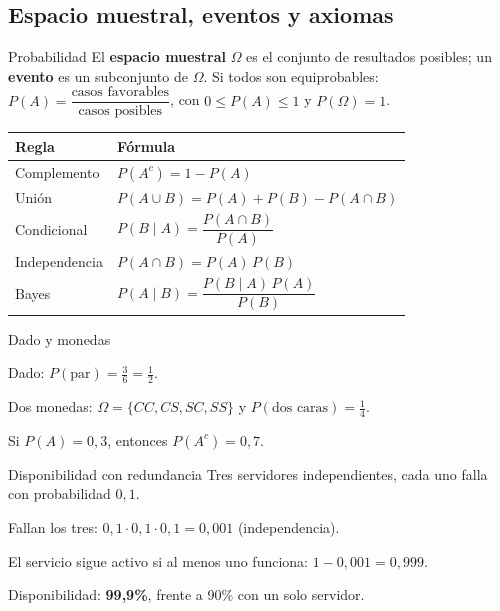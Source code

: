 

\subsection{Espacio muestral, eventos y axiomas}
\begin{tmdef}{Probabilidad}
El \textbf{espacio muestral} $\Omega$ es el conjunto de resultados posibles; un \textbf{evento} es un subconjunto de $\Omega$. Si todos son equiprobables: $P(A)=\dfrac{\text{casos favorables}}{\text{casos posibles}}$, con $0\le P(A)\le1$ y $P(\Omega)=1$.
\end{tmdef}

\begin{center}
\begin{tabular}{|l|l|}
\hline
\rowcolor{tmAzulClaro}\textbf{Regla} & \textbf{F\'ormula}\\ \hline
Complemento & $P(A^c)=1-P(A)$\\ \hline
Uni\'on & $P(A\cup B)=P(A)+P(B)-P(A\cap B)$\\ \hline
Condicional & $P(B\mid A)=\dfrac{P(A\cap B)}{P(A)}$\\ \hline
Independencia & $P(A\cap B)=P(A)\,P(B)$\\ \hline
Bayes & $P(A\mid B)=\dfrac{P(B\mid A)\,P(A)}{P(B)}$\\ \hline
\end{tabular}
\end{center}

\begin{tmejemplo}{Dado y monedas}
\begin{tmpasos}
\item Dado: $P(\text{par})=\frac36=\frac12$.
\item Dos monedas: $\Omega=\{CC, CS, SC, SS\}$ y $P(\text{dos caras})=\frac14$.
\item Si $P(A)=0{,}3$, entonces $P(A^c)=0{,}7$.
\end{tmpasos}
\end{tmejemplo}

\begin{tmejemplo}{Disponibilidad con redundancia}
Tres servidores independientes, cada uno falla con probabilidad $0{,}1$.
\begin{tmpasos}
\item Fallan los tres: $0{,}1\cdot0{,}1\cdot0{,}1=0{,}001$ (independencia).
\item El servicio sigue activo si al menos uno funciona: $1-0{,}001=0{,}999$.
\item Disponibilidad: \textbf{99,9\%}, frente a 90\% con un solo servidor.
\end{tmpasos}
\end{tmejemplo}

